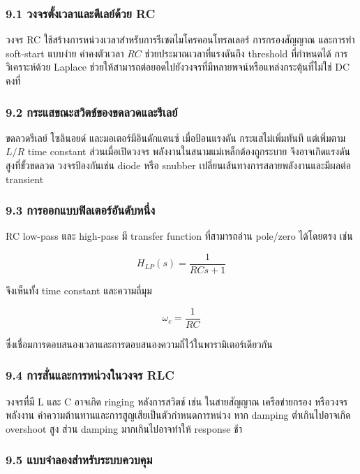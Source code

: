 \subsubsection{9.1 วงจรตั้งเวลาและดีเลย์ด้วย RC}

วงจร RC ใช้สร้างการหน่วงเวลาสำหรับการรีเซตไมโครคอนโทรลเลอร์ การกรองสัญญาณ และการทำ soft-start แบบง่าย ค่าคงตัวเวลา $RC$ ช่วยประมาณเวลาที่แรงดันถึง threshold ที่กำหนดได้ การวิเคราะห์ด้วย Laplace ช่วยให้สามารถต่อยอดไปยังวงจรที่มีหลายพจน์หรือแหล่งกระตุ้นที่ไม่ใช่ DC คงที่

\subsubsection{9.2 กระแสขณะสวิตช์ของขดลวดและรีเลย์}

ขดลวดรีเลย์ โซลินอยด์ และมอเตอร์มีอินดักแตนซ์ เมื่อป้อนแรงดัน กระแสไม่เพิ่มทันที แต่เพิ่มตาม $L/R$ time constant ส่วนเมื่อเปิดวงจร พลังงานในสนามแม่เหล็กต้องถูกระบาย จึงอาจเกิดแรงดันสูงที่ขั้วขดลวด วงจรป้องกันเช่น diode หรือ snubber เปลี่ยนเส้นทางการสลายพลังงานและมีผลต่อ transient

\subsubsection{9.3 การออกแบบฟิลเตอร์อันดับหนึ่ง}

RC low-pass และ high-pass มี transfer function ที่สามารถอ่าน pole/zero ได้โดยตรง เช่น

\[
H_{LP}(s)=\frac{1}{RCs+1}
\]

จึงเห็นทั้ง time constant และความถี่มุม

\[
\omega_c=\frac{1}{RC}
\]

ซึ่งเชื่อมการตอบสนองเวลาและการตอบสนองความถี่ไว้ในพารามิเตอร์เดียวกัน

\subsubsection{9.4 การสั่นและการหน่วงในวงจร RLC}

วงจรที่มี L และ C อาจเกิด ringing หลังการสวิตช์ เช่น ในสายสัญญาณ เครือข่ายกรอง หรือวงจรพลังงาน ค่าความต้านทานและการสูญเสียเป็นตัวกำหนดการหน่วง หาก damping ต่ำเกินไปอาจเกิด overshoot สูง ส่วน damping มากเกินไปอาจทำให้ response ช้า

\subsubsection{9.5 แบบจำลองสำหรับระบบควบคุม}

